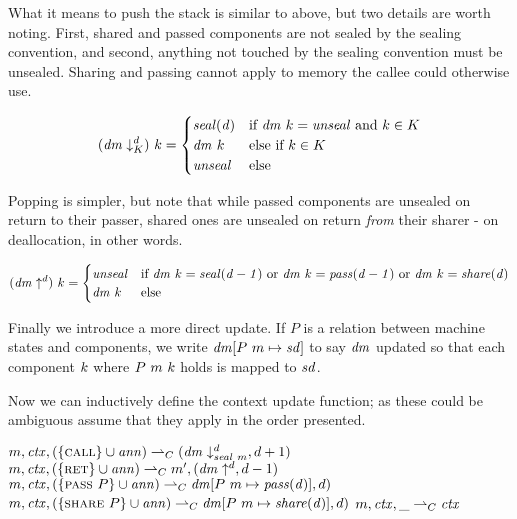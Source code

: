 \documentclass[acmsmall,review,anonymous]{acmart}\settopmatter{printfolios=true,printccs=false,printacmref=false}
\begin{document}
What it means to push the stack is similar to above, but two details are worth noting.
First, shared and passed components are not sealed by the sealing convention, and second,
anything not touched by the sealing convention must be unsealed. Sharing and passing cannot
apply to memory the callee could otherwise use.

\[
(\mathit{dm} \downarrow^{d}_{K}) ~ k =
\begin{cases}
  \mathit{seal(d)} & \text{if } \mathit{dm} ~ k = \mathit{unseal}
                    \text{ and } k \in K \\
  \mathit{dm} ~ k & \text{else if } k \in K \\
  \mathit{unseal} & \text{else} \\
\end{cases}
\]

Popping is simpler, but note that while passed components are unsealed on return to their
passer, shared ones are unsealed on return {\em from} their sharer - on deallocation,
in other words.

\[
(\mathit{dm} \uparrow^{d}) ~ k =
\begin{cases}
  \mathit{unseal} & \text{if } \mathit{dm} ~ k = \mathit{seal(d-1)}
              \text{ or } \mathit{dm} ~ k = \mathit{pass(d-1)}
              \text{ or } \mathit{dm} ~ k = \mathit{share(d)} \\
  \mathit{dm} ~ k & \text{else} \\
\end{cases}
\]

Finally we introduce a more direct update. If \(P\) is a relation between machine states and
components, we write \(\mathit{dm}[P ~ m \mapsto \mathit{sd}]\) to say \(\mathit{dm}\) updated
so that each component \(k\) where \(P ~ m ~ k\) holds is mapped to
\(\mathit{sd}\).

Now we can inductively define the context update function; as these could be ambiguous assume that
they apply in the order presented.

\begin{center}
  \judgment{\(\mach,\context,\ann \stepstocon (\domMap,\depth)\)}
           {\(m,\mathit{ctx},(\{\text{\sc call}\} \cup \mathit{ann}) \overset{}{\rightharpoonup}_C
             (\mathit{dm} \downarrow^{d}_{\mathit{seal} ~ m},d+1)\)}
  \judgment{\(\mach,\context,\ann \stepstocon (\domMap,\depth)\)}
           {\(m,\mathit{ctx},(\{\text{\sc ret}\} \cup \mathit{ann}) \overset{}{\rightharpoonup}_C
             m',(\mathit{dm} \uparrow^{d},d-1)\)}
  \judgment{\(\mach,\context,\ann \stepstocon (\domMap,\depth)\)}
           {\(m,\mathit{ctx},(\{\text{\sc pass} ~ P\} \cup \mathit{ann}) \overset{}{\rightharpoonup}_C
             \mathit{dm}[P ~ m \mapsto \mathit{pass(d)}], d)\)}
  \judgment{\(\mach,\context,\ann \stepstocon (\domMap,\depth)\)}
           {\(m,\mathit{ctx},(\{\text{\sc share} ~ P\} \cup \mathit{ann}) \overset{}{\rightharpoonup}_C
             \mathit{dm}[P ~ m \mapsto \mathit{share(d)}], d)\)}
  \judgment{}
           {\(m,\mathit{ctx},\_ \overset{}{\rightharpoonup}_C \mathit{ctx}\)}
\end{center}
\end{document}
